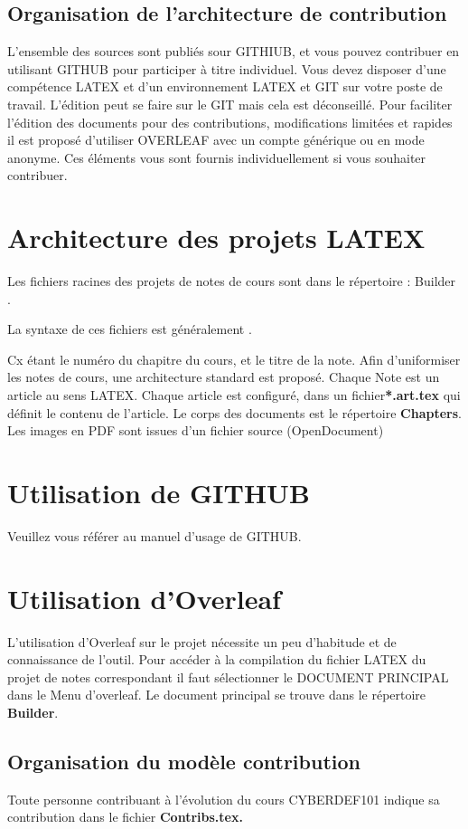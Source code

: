 

\subsection{Organisation de l'architecture de contribution}

L'ensemble des sources sont publiés sour GITHIUB, et vous pouvez contribuer en utilisant GITHUB pour participer à titre individuel. Vous devez disposer d'une compétence LATEX et d'un environnement LATEX et GIT sur votre poste de travail. L'édition peut se faire sur le GIT mais cela est déconseillé. Pour faciliter l'édition des documents pour des contributions, modifications limitées et rapides il est proposé d'utiliser OVERLEAF avec un compte générique ou en mode anonyme. Ces éléments vous sont fournis individuellement si vous souhaiter contribuer.

\section{Architecture des projets LATEX}

Les fichiers racines des projets de notes de cours sont dans le répertoire : \textbf{}{Builder} . 


La syntaxe de ces fichiers est généralement . 

Cx étant le numéro du chapitre du cours, et  le titre de la note.
Afin d'uniformiser les notes de cours, une architecture standard est proposé. Chaque Note est un article au sens LATEX. Chaque article est configuré, dans un fichier\textbf{*.art.tex} qui définit le contenu de l'article. Le corps des documents est le répertoire \textbf{Chapters}. 
Les images en PDF sont issues d'un fichier source (OpenDocument)

\section{Utilisation de GITHUB}

Veuillez vous référer au manuel d'usage de GITHUB.

\section{Utilisation d'Overleaf}

L'utilisation d'Overleaf sur le projet nécessite un peu d'habitude et de connaissance de l'outil. Pour accéder à la compilation du fichier LATEX du projet de notes correspondant il faut sélectionner le DOCUMENT PRINCIPAL dans le Menu d'overleaf. Le document principal se trouve dans le répertoire \textbf{Builder}.






\subsection{Organisation du modèle contribution}

Toute personne contribuant à l'évolution du cours CYBERDEF101 indique sa contribution dans le fichier \bf{Contribs.tex}.